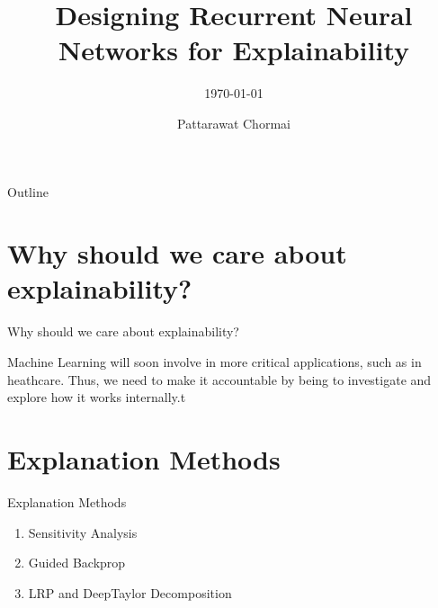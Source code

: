\documentclass[Nike]{tuberlinbeamer}
\title{Designing Recurrent Neural Networks for Explainability}
\subtitle{\today}
\author[@Someplace]{Pattarawat Chormai}
\institute{Technische Universität Berlin}
\begin{document}
\begin{frame}
\maketitle
\end{frame}


\begin{frame}{Outline}
\tableofcontents
\end{frame}


\section{Why should we care about explainability?}	
\begin{frame}{Why should we care about explainability?}

	Machine Learning will soon involve in more critical applications, such as in heathcare. Thus, we need to make it accountable by being to investigate and explore how it works internally.t
\end{frame}


\section{Explanation Methods}
\begin{frame}{Explanation Methods}

\begin{enumerate}
	\item<1-> Sensitivity Analysis \citep{SimonyanDeepConvolutionalNetworks2013}
	\item<2-> Guided Backprop \citep{SpringenbergStrivingSimplicityAll2015a}
	\item<3-> LRP \citep{BinderLayerWiseRelevancePropagation2016} and DeepTaylor Decomposition \citep{MontavonExplainingnonlinearclassification2017}

\end{enumerate}	
\end{frame}
\end{document}
